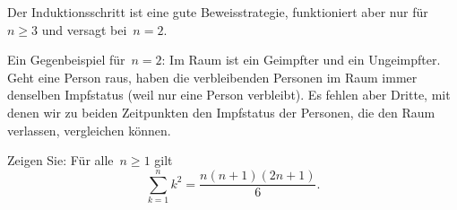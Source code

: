 \documentclass[a4paper]{article}
\begin{document}
\begin{solution}
    Der Induktionsschritt ist eine gute Beweisstrategie, funktioniert aber nur für~$n \geq 3$ und versagt bei~$n = 2$.

    Ein Gegenbeispiel für~$n = 2$: Im Raum ist ein Geimpfter und ein Ungeimpfter. Geht eine Person raus, haben die verbleibenden Personen im Raum immer denselben Impfstatus (weil nur eine Person verbleibt). Es fehlen aber Dritte, mit denen wir zu beiden Zeitpunkten den Impfstatus der Personen, die den Raum verlassen, vergleichen können.

    \begin{center}
    \end{center}
\end{solution}

\begin{problem}
Zeigen Sie: Für alle~$n \geq 1$ gilt
\begin{equation}
    \sum_{k=1}^n k^2 = \frac{n (n+1) (2n+1)}{6}.\label{prob:eqn:sumsquare}
\end{equation}
\end{problem}
\end{document}
